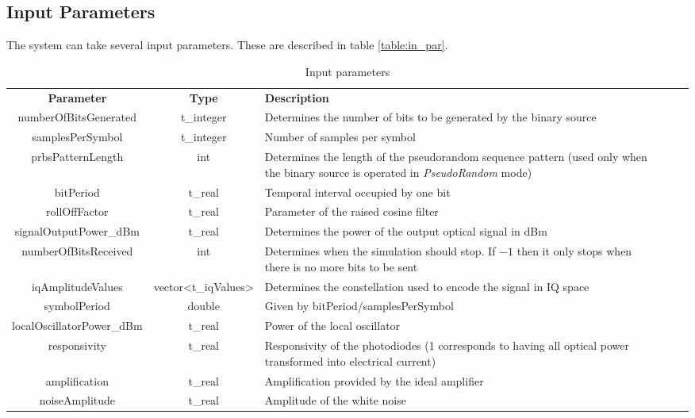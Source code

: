 \subsection*{Input Parameters}

The system can take several input parameters. These are described in table \ref{table:in_par}.

\begin{table}[]
	\centering
	\caption{Input parameters}
	\begin{tabular}{|c|c|p{70mm}|ccp{70mm}}
		\cline{1-3}
		\textbf{Parameter} & \textbf{Type} & \textbf{Description} &    \\ \cline{1-3}
		numberOfBitsGenerated & t\_integer & Determines the number of bits to be generated by the binary source  &    \\ \cline{1-3}
		samplesPerSymbol & t\_integer & Number of samples per symbol &    \\ \cline{1-3}
		prbsPatternLength & int & Determines the length of the pseudorandom sequence pattern (used only when the binary source is operated in \textit{PseudoRandom} mode) &    \\ \cline{1-3}
		bitPeriod & t\_real & Temporal interval occupied by one bit &    \\ \cline{1-3}
		rollOffFactor & t\_real & Parameter of the raised cosine filter &    \\ \cline{1-3}
		signalOutputPower\_dBm & t\_real & Determines the power of the output optical signal in dBm &  \\ \cline{1-3}
		numberOfBitsReceived & int &   Determines when the simulation should stop. If $-1$ then it only stops when there is no more bits to be sent&   \\ \cline{1-3}
		iqAmplitudeValues & vector<t\_iqValues> & Determines the constellation used to encode the signal in IQ space &    \\ \cline{1-3}
		symbolPeriod & double & Given by bitPeriod/samplesPerSymbol &    \\ \cline{1-3}
		localOscillatorPower\_dBm & t\_real & Power of the local oscillator &    \\ \cline{1-3}
		responsivity & t\_real & Responsivity of the photodiodes (1 corresponds to having all optical power transformed into electrical current) &    \\ \cline{1-3}
		amplification & t\_real & Amplification provided by the ideal amplifier &    \\ \cline{1-3}
		noiseAmplitude & t\_real & Amplitude of the white noise &    \\ \cline{1-3}

\end{tabular}
\end{table}

